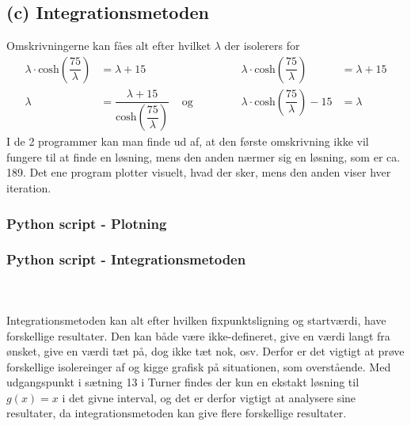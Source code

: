 \subsection*{(c) Integrationsmetoden}
Omskrivningerne kan fåes alt efter hvilket $\lambda$ der isolerers for
$$
\begin{array}{rlcrl}
\lambda \cdot \text{cosh}(\dfrac{75}{\lambda})&=\lambda+15 & \phantom{matematik} & \lambda \cdot \text{cosh}(\dfrac{75}{\lambda})&=\lambda+15\\
\lambda &=\dfrac{\lambda+15}{\text{cosh}(\dfrac{75}{\lambda})} & \text{ og } & \lambda \cdot \text{cosh}(\dfrac{75}{\lambda})-15 &=\lambda
\end{array}
$$ 
%
%
I de 2 programmer kan man finde ud af, at den første omskrivning ikke vil fungere til at finde en løsning, mens den anden nærmer sig en løsning, som er ca. 189. Det ene program plotter visuelt, hvad der sker, mens den anden viser hver iteration.
% 
%
\subsubsection*{Python script - Plotning}
%
\lstset{style=mystyle}

%
\subsubsection*{Python script - Integrationsmetoden}
%
\lstset{style=mystyle}

%
\phantom{matematik}\\\\
Integrationsmetoden kan alt efter hvilken fixpunktsligning og startværdi, have forskellige resultater. 
Den kan både være ikke-defineret, give en værdi langt fra ønsket, give en værdi tæt på, dog ikke tæt nok, osv. 
Derfor er det vigtigt at prøve forskellige isolereinger af og kigge grafisk på situationen, som overstående. 
Med udgangspunkt i sætning 13 i Turner findes der kun en ekstakt løsning til $g(x)=x$ i det givne interval, og det er derfor vigtigt at analysere sine resultater, da integrationsmetoden kan give flere forskellige resultater.
\\\\
% 